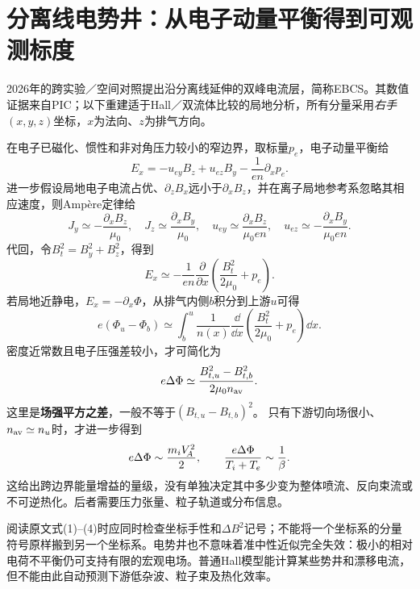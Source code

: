 \documentclass[UTF8,a4paper,11pt,openany,fontset=fandol]{ctexbook}
\begin{document}
\section{分离线电势井：从电子动量平衡得到可观测标度}
2026年的跨实验／空间对照提出沿分离线延伸的双峰电流层，简称EBCS。其数值证据来自PIC；以下重建适于Hall／双流体比较的局地分析，所有分量采用\emph{右手}$(x,y,z)$坐标，$x$为法向、$z$为排气方向。\citep{L312}

在电子已磁化、惯性和非对角压力较小的窄边界，取标量$p_e$，电子动量平衡给
\begin{equation}
 E_x=-u_{ey}B_z+u_{ez}B_y-\frac{1}{en}\partial_xp_e.
\end{equation}
进一步假设局地电子电流占优、$\partial_zB_x$远小于$\partial_xB_z$，并在离子局地参考系忽略其相应速度，则Ampère定律给
\begin{equation}
 J_y\simeq-\frac{\partial_xB_z}{\mu_0},\quad
 J_z\simeq\frac{\partial_xB_y}{\mu_0},\quad
 u_{ey}\simeq\frac{\partial_xB_z}{\mu_0en},\quad
 u_{ez}\simeq-\frac{\partial_xB_y}{\mu_0en}.
\end{equation}
代回，令$B_t^2=B_y^2+B_z^2$，得到
\begin{equation}
 E_x\simeq-\frac{1}{en}\frac{\partial}{\partial x}
 \left(\frac{B_t^2}{2\mu_0}+p_e\right).
\end{equation}
若局地近静电，$E_x=-\partial_x\Phi$，从排气内侧$b$积分到上游$u$可得
\begin{equation}
 e(\Phi_u-\Phi_b)
 \simeq\int_b^u\frac{1}{n(x)}\frac{\dd}{\dd x}
 \left(\frac{B_t^2}{2\mu_0}+p_e\right)\dd x.
\end{equation}
密度近常数且电子压强差较小，才可简化为
\begin{equation}
 e\Delta\Phi\simeq\frac{B_{t,u}^2-B_{t,b}^2}{2\mu_0n_{\rm av}}.
 \label{eq:separatrix_potential}
\end{equation}
这里是\textbf{场强平方之差}，一般不等于$(B_{t,u}-B_{t,b})^2$。
只有下游切向场很小、$n_{\rm av}\simeq n_u$时，才进一步得到
\begin{equation}
 e\Delta\Phi\sim\frac{m_iV_{\!A}^2}{2},\qquad
 \frac{e\Delta\Phi}{T_i+T_e}\sim\frac1\beta.
\end{equation}
这给出跨边界能量增益的量级，没有单独决定其中多少变为整体喷流、反向束流或不可逆热化。后者需要压力张量、粒子轨道或分布信息。

阅读原文式(1)--(4)时应同时检查坐标手性和$\Delta B^2$记号；不能将一个坐标系的分量符号原样搬到另一个坐标系。电势井也不意味着准中性近似完全失效：极小的相对电荷不平衡仍可支持有限的宏观电场。普通Hall模型能计算某些势井和漂移电流，但不能由此自动预测下游低杂波、粒子束及热化效率。
\end{document}
